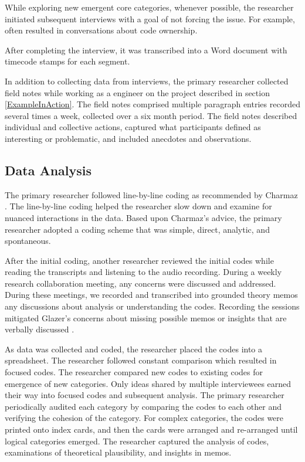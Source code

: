 While exploring new emergent core categories, whenever possible, the researcher initiated subsequent interviews with a goal of not forcing the issue. For example,  often resulted in conversations about code ownership. 

After completing the interview, it was transcribed into a Word document with timecode stamps for each segment.

In addition to collecting data from interviews, the primary researcher collected field notes while working as a engineer on the project described in section \ref{ExampleInAction}. The field notes comprised multiple paragraph entries recorded several times a week, collected over a six month period. The field notes described individual and collective actions, captured what participants defined as interesting or problematic, and included anecdotes and observations. 
\subsection{Data Analysis}
The primary researcher followed line-by-line coding as recommended by Charmaz \cite{Charmaz}. The line-by-line coding helped the researcher slow down and examine for nuanced interactions in the data. Based upon Charmaz's advice, the primary researcher adopted a coding scheme that was simple, direct, analytic, and spontaneous.  

After the initial coding, another researcher reviewed the initial codes while reading the transcripts and listening to the audio recording. During a weekly research collaboration meeting, any concerns were discussed and addressed. During these meetings, we recorded and transcribed into grounded theory memos any discussions about analysis or understanding the codes. Recording the sessions mitigated Glazer's concerns about missing possible memos or insights that are verbally discussed \cite{GlaserTheoreticalSensitivity}.

As data was collected and coded, the researcher placed the codes into a spreadsheet. The researcher followed constant comparison which resulted in focused codes.  The researcher compared new codes to existing codes for emergence of new categories. Only ideas shared by multiple interviewees earned their way into focused codes and subsequent analysis. The primary researcher periodically audited each category by comparing the codes to each other and verifying the cohesion of the category. For complex categories, the codes were printed onto index cards, and then the cards were arranged and re-arranged until logical categories emerged.  The researcher captured the analysis of codes, examinations of theoretical plausibility, and insights in memos. 

